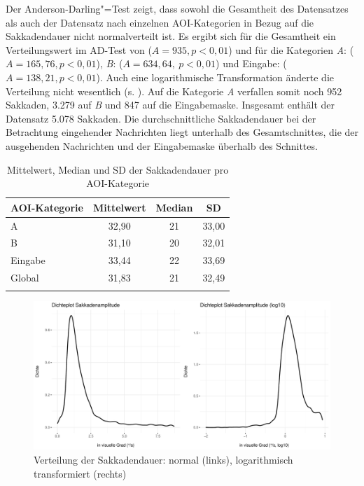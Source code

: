 Der Anderson-Darling"=Test zeigt, dass sowohl die Gesamtheit des Datensatzes als auch der Datensatz nach einzelnen AOI-Kategorien in Bezug auf die Sakkadendauer nicht normalverteilt ist. Es ergibt sich für die Gesamtheit ein Verteilungswert im AD-Test von ($A = 935, p < 0,01$) und für die Kategorien \emph{A}: ($A = 165,76, p < 0,01$), \emph{B}: ($A = 634,64,\allowbreak\ p < 0,01$) und Eingabe: ($A = 138,21, p < 0,01$). Auch eine logarithmische Transformation änderte die Verteilung nicht wesentlich (s. ). Auf die Kategorie \emph{A} verfallen somit noch 952 Sakkaden, 3.279 auf \emph{B} und 847 auf die Eingabemaske. Insgesamt enthält der Datensatz 5.078 Sakkaden. Die durchschnittliche Sakkadendauer bei der Betrachtung eingehender Nachrichten liegt unterhalb des Gesamtschnittes, die der ausgehenden Nachrichten und der Eingabemaske überhalb des Schnittes.\largerpage[-1]


\begin{table}
    \begin{tabular}{lccc}  
    \lsptoprule
        {AOI-Kategorie} & {Mittelwert} & {Median} & {SD} \\ 
        \midrule
        A  & 32,90 & 21 & 33,00 \\
        B  & 31,10 & 20 & 32,01 \\ 
        Eingabe & 33,44 & 22 & 33,69 \\ 
        \midrule
        Global  &31,83 & 21 & 32,49 \\ 
        \lspbottomrule
    \end{tabular}
    \caption[Mittelwert, Median und SD der Sakkadendauer]{Mittelwert, Median und SD der Sakkadendauer pro AOI-Kategorie}
    \label{K6:tab:DeDe:sacdur-mean-sd}
\end{table}



\begin{figure}
    \includegraphics[width=\textwidth]{Figures/EyeTracking/DD/ggplot_DD-SacAmp_density_de}
	\caption{Verteilung der Sakkadendauer: normal (links), logarithmisch transformiert (rechts)}
	\label{K6:fig:DeDe:sacdur-density}
\end{figure}

